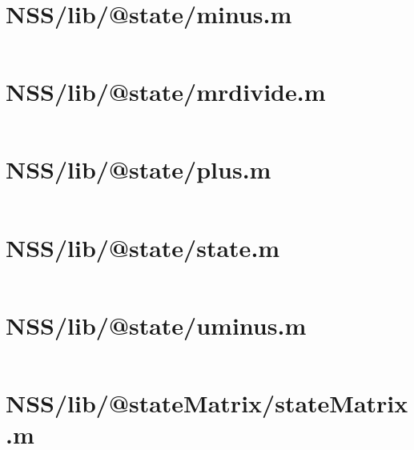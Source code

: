 \pagebreak
\section*{NSS/lib/@state/minus.m}\label{code:NSS/lib/@state/minus.m}
\inputminted[linenos,fontsize=\scriptsize]{matlab}{/home/dcouture/git/mathyourlife/TSatPy/beta_versions/matlab_object_oriented/lib/@state/minus.m}

\pagebreak
\section*{NSS/lib/@state/mrdivide.m}\label{code:NSS/lib/@state/mrdivide.m}
\inputminted[linenos,fontsize=\scriptsize]{matlab}{/home/dcouture/git/mathyourlife/TSatPy/beta_versions/matlab_object_oriented/lib/@state/mrdivide.m}

\pagebreak
\section*{NSS/lib/@state/plus.m}\label{code:NSS/lib/@state/plus.m}
\inputminted[linenos,fontsize=\scriptsize]{matlab}{/home/dcouture/git/mathyourlife/TSatPy/beta_versions/matlab_object_oriented/lib/@state/plus.m}

\pagebreak
\section*{NSS/lib/@state/state.m}\label{code:NSS/lib/@state/state.m}
\inputminted[linenos,fontsize=\scriptsize]{matlab}{/home/dcouture/git/mathyourlife/TSatPy/beta_versions/matlab_object_oriented/lib/@state/state.m}

\pagebreak
\section*{NSS/lib/@state/uminus.m}\label{code:NSS/lib/@state/uminus.m}
\inputminted[linenos,fontsize=\scriptsize]{matlab}{/home/dcouture/git/mathyourlife/TSatPy/beta_versions/matlab_object_oriented/lib/@state/uminus.m}

\pagebreak
\section*{NSS/lib/@stateMatrix/stateMatrix.m}\label{code:NSS/lib/@stateMatrix/stateMatrix.m}
\inputminted[linenos,fontsize=\scriptsize]{matlab}{/home/dcouture/git/mathyourlife/TSatPy/beta_versions/matlab_object_oriented/lib/@stateMatrix/stateMatrix.m}

